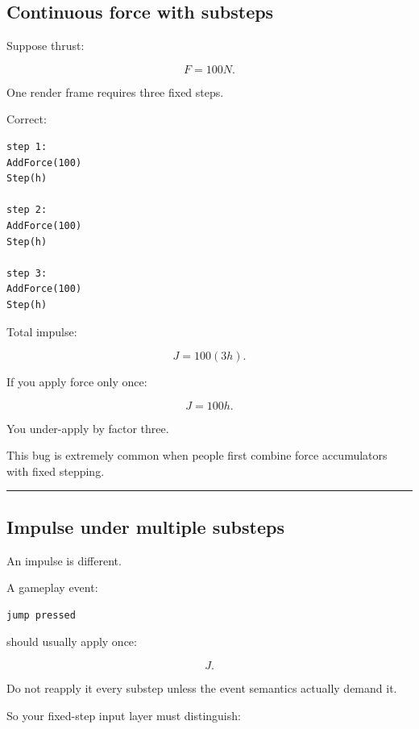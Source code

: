 \subsection{Continuous force with substeps}\label{06-engine-ii-ch037-continuous-force-with-substeps}

\hypertarget{06-engine-ii-ch037-continuous-force-with-substeps}{}

Suppose thrust:

\[
F=100N.
\]

One render frame requires three fixed steps.

Correct:

\begin{verbatim}
step 1:
AddForce(100)
Step(h)

step 2:
AddForce(100)
Step(h)

step 3:
AddForce(100)
Step(h)
\end{verbatim}

Total impulse:

\[
J
=
100(3h).
\]

If you apply force only once:

\[
J
=
100h.
\]

You under-apply by factor three.

This bug is extremely common when people first combine force accumulators with fixed stepping.

\begin{center}\rule{0.5\linewidth}{0.5pt}\end{center}

\subsection{Impulse under multiple substeps}\label{06-engine-ii-ch037-impulse-under-multiple-substeps}

\hypertarget{06-engine-ii-ch037-impulse-under-multiple-substeps}{}

An impulse is different.

A gameplay event:

\begin{verbatim}
jump pressed
\end{verbatim}

should usually apply once:

\[
J.
\]

Do not reapply it every substep unless the event semantics actually demand it.

So your fixed-step input layer must distinguish:

